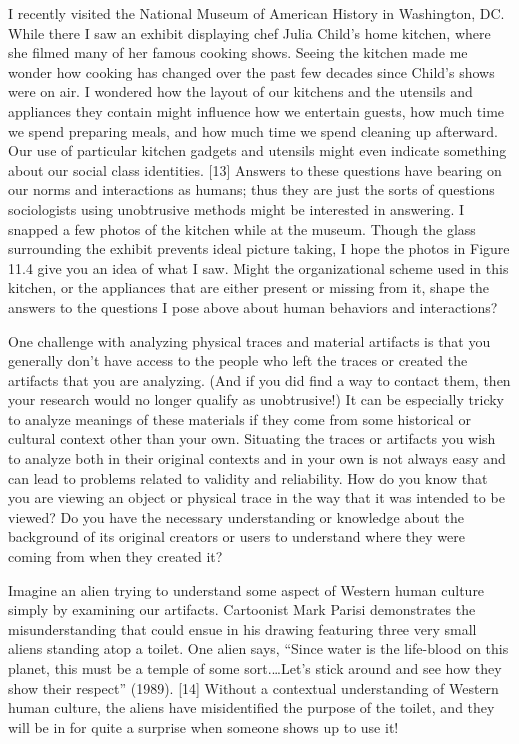 I recently visited the National Museum of American History in Washington, DC. While there I saw an exhibit displaying chef Julia Child’s home kitchen, where she filmed many of her famous cooking shows. Seeing the kitchen made me wonder how cooking has changed over the past few decades since Child’s shows were on air. I wondered how the layout of our kitchens and the utensils and appliances they contain might influence how we entertain guests, how much time we spend preparing meals, and how much time we spend cleaning up afterward. Our use of particular kitchen gadgets and utensils might even indicate something about our social class identities. [13] Answers to these questions have bearing on our norms and interactions as humans; thus they are just the sorts of questions sociologists using unobtrusive methods might be interested in answering. I snapped a few photos of the kitchen while at the museum. Though the glass surrounding the exhibit prevents ideal picture taking, I hope the photos in Figure 11.4 give you an idea of what I saw. Might the organizational scheme used in this kitchen, or the appliances that are either present or missing from it, shape the answers to the questions I pose above about human behaviors and interactions?

One challenge with analyzing physical traces and material artifacts is that you generally don’t have access to the people who left the traces or created the artifacts that you are analyzing. (And if you did find a way to contact them, then your research would no longer qualify as unobtrusive!) It can be especially tricky to analyze meanings of these materials if they come from some historical or cultural context other than your own. Situating the traces or artifacts you wish to analyze both in their original contexts and in your own is not always easy and can lead to problems related to validity and reliability. How do you know that you are viewing an object or physical trace in the way that it was intended to be viewed? Do you have the necessary understanding or knowledge about the background of its original creators or users to understand where they were coming from when they created it?

Imagine an alien trying to understand some aspect of Western human culture simply by examining our artifacts. Cartoonist Mark Parisi demonstrates the misunderstanding that could ensue in his drawing featuring three very small aliens standing atop a toilet. One alien says, “Since water is the life-blood on this planet, this must be a temple of some sort.…Let’s stick around and see how they show their respect” (1989). [14] Without a contextual understanding of Western human culture, the aliens have misidentified the purpose of the toilet, and they will be in for quite a surprise when someone shows up to use it!

